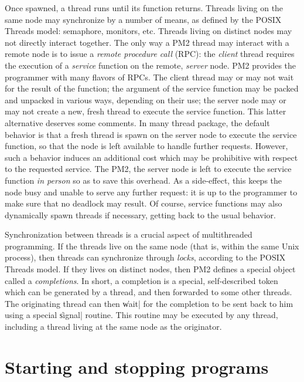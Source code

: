 Once spawned, a thread runs until its function returns. Threads living
on the same node may synchronize by a number of means, as defined by
the POSIX Threads model: semaphore, monitors, etc. Threads living on
distinct nodes may not directly interact together. The only way a PM2
thread may interact with a remote node is to issue a \emph{remote
  procedure call} (RPC): the \emph{client} thread requires the
execution of a \emph{service} function on the remote, \emph{server}
node. PM2 provides the programmer with many flavors of RPCs. The
client thread may or may not wait for the result of the function; the
argument of the service function may be packed and unpacked in various
ways, depending on their use; the server node may or may not create a
new, fresh thread to execute the service function. This latter
alternative deserves some comments. In many thread package, the
default behavior is that a fresh thread is spawn on the server node to
execute the service function, so that the node is left available to
handle further requests. However, such a behavior induces an
additional cost which may be prohibitive with respect to the requested
service.  The PM2, the server node is left to execute the service
function \emph{in person} so as to save this overhead. As a
side-effect, this keeps the node busy and unable to serve any further
request: it is up to the programmer to make sure that no deadlock may
result. Of course, service functions may also dynamically spawn
threads if necessary, getting back to the usual behavior.

Synchronization between threads is a crucial aspect of multithreaded
programming. If the threads live on the same node (that is, within the
same Unix process), then threads can synchronize through \emph{locks},
according to the POSIX Threads model. If they lives on distinct nodes,
then PM2 defines a special object called a \emph{completions}. In
short, a completion is a special, self-described token which can be
generated by a thread, and then forwarded to some other threads. The
originating thread can then \|wait| for the completion to be sent back
to him using a special \|signal| routine. This routine may be executed
by any thread, including a thread living at the same node as the
originator. 


\section{Starting and stopping programs}

